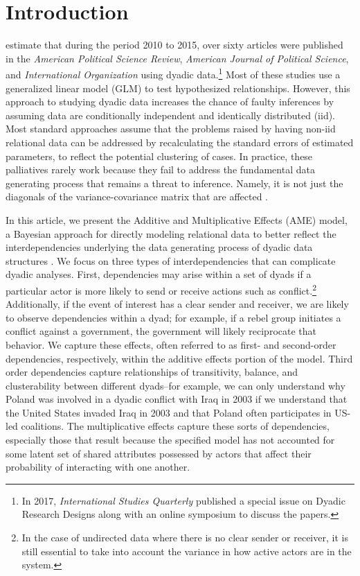 \section{\textbf{Introduction}}

\citet{aronow:etal:2015} estimate that during the period 2010 to 2015, over sixty articles were published in the \textit{American Political Science Review}, \textit{American Journal of Political Science}, and \textit{International Organization} using dyadic data.\footnote{In 2017, \textit{International Studies Quarterly} published a special issue on Dyadic Research Designs along with an online symposium to discuss the papers.} Most of these studies use a generalized linear model (GLM) to test hypothesized relationships.  However, this approach to studying dyadic data increases the chance of faulty inferences by assuming data are conditionally independent and identically distributed (iid). Most standard approaches assume that the problems raised by having non-iid relational data can be addressed by recalculating the standard errors of estimated parameters, to reflect the potential clustering of cases. In practice, these palliatives rarely work because they fail to address the fundamental data generating process that remains a threat to inference. Namely,   it is not just the diagonals of the variance-covariance matrix that are affected \citep{beck:2012,franzese:hayes:2007,king:roberts:2014}. 

In this article, we present the Additive and Multiplicative Effects (AME) model, a Bayesian approach for directly modeling relational data to better reflect the interdependencies underlying the data generating process of dyadic data structures \citep{hoff:2008,minhas:etal:2016:arxiv}. We focus on three types of interdependencies that can complicate dyadic analyses. First, dependencies may arise within a set of dyads if a particular actor is more likely to send or receive actions such as conflict.\footnote{In the case of undirected data where there is no clear sender or receiver, it is still essential to take into account the variance in how active actors are in the system.} Additionally, if the event of interest has a clear sender and receiver, we are likely to observe dependencies within a dyad; for example, if a rebel group initiates a conflict against a government, the government will likely reciprocate that behavior. We capture these effects, often referred to as first- and second-order dependencies, respectively, within the additive effects portion of the model. Third order dependencies capture relationships of transitivity, balance, and clusterability between different dyads--for example, we can only understand why Poland was involved in a dyadic conflict with Iraq in 2003 if we understand that the United States invaded Iraq in 2003 and that Poland often participates in US-led coalitions. The multiplicative effects capture these sorts of dependencies, especially those that result because the specified model has not accounted for some latent set of shared attributes possessed by actors that affect their probability of interacting with one another.  

